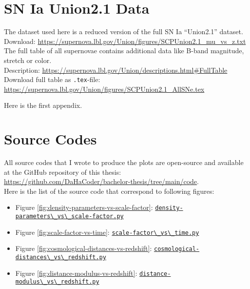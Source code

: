 \begin{appendix}

\chapter{SN Ia Union2.1 Data}
\label{app:sn-ia-union2.1-data}
\thispagestyle{empty}

The dataset used here is a reduced version of the full SN Ia ``Union2.1'' dataset. \\
Download: \href{https://supernova.lbl.gov/Union/figures/SCPUnion2.1\_mu\_vs\_z.txt}{https://supernova.lbl.gov/Union/figures/SCPUnion2.1\_mu\_vs\_z.txt} \\
The full table of all supernovae contains additional data like B-band magnitude, stretch or color. \\
Description: \href{https://supernova.lbl.gov/Union/descriptions.html\#FullTable}{https://supernova.lbl.gov/Union/descriptions.html\#FullTable} \\
Download full table as \texttt{.tex}-file: \href{https://supernova.lbl.gov/Union/figures/SCPUnion2.1\_AllSNe.tex}{https://supernova.lbl.gov/Union/figures/SCPUnion2.1\_AllSNe.tex}


Here is the first appendix.


\chapter{Source Codes}
\label{app:source-codes}
\thispagestyle{empty}

All source codes that I wrote to produce the plots are open-source and available at the GitHub repository of this thesis: \href{https://github.com/DaHaCoder/bachelor-thesis/tree/main/code}{https://github.com/DaHaCoder/bachelor-thesis/tree/main/code}. \\
Here is the list of the source code that correspond to following figures:

\begin{itemize}
    \item Figure \ref{fig:density-parameters-vs-scale-factor}: \href{https://github.com/DaHaCoder/bachelor-thesis/blob/main/code/density-parameters\_vs\_scale-factor.py}{\lstinline{density-parameters\_vs\_scale-factor.py}}
    \item Figure \ref{fig:scale-factor-vs-time}: \href{https://github.com/DaHaCoder/bachelor-thesis/blob/main/code/scale-factor\_vs\_time.py}{\lstinline{scale-factor\_vs\_time.py}}
    \item Figure \ref{fig:cosmological-distances-vs-redshift}: \href{https://github.com/DaHaCoder/bachelor-thesis/blob/main/code/cosmological-distances\_vs\_redshift.py}{\lstinline{cosmological-distances\_vs\_redshift.py}}
    \item Figure \ref{fig:distance-modulus-vs-redshift}: \href{https://github.com/DaHaCoder/bachelor-thesis/blob/main/code/distance-modulus\_vs\_redshift.py}{\lstinline{distance-modulus\_vs\_redshift.py}}
\end{itemize}


\end{appendix}
